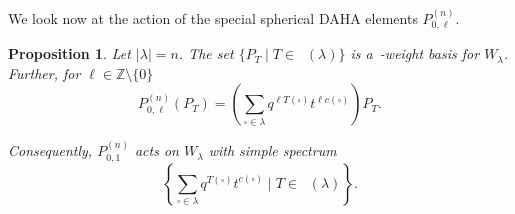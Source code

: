 \documentclass[10pt,a4paper]{amsart}
\numberwithin{equation}{section}
\newtheorem{Proposition}[Theorem]{Proposition}
\theoremstyle{definition}
\DeclareMathOperator{\RSSYT}{\mathrm{RSSYT}_{\geq 0}}
\begin{document}
We look now at the action of the special spherical DAHA elements $P_{0,\ell}^{(n)}$.

\begin{Proposition}\label{finite rank gen macd function properties}
 Let $|\lambda| = n$. The set $\{P_T\mid T \in \RSSYT(\lambda)\}$ is a~-weight basis for $W_{\lambda}$. Further, for $\ell \in \mathbb{Z}\setminus\{0\}$
 \[
 P_{0,\ell}^{(n)}(P_T) = \left( \sum_{\square \in \lambda} q^{\ell T(\square)}t^{\ell c(\square)} \right) P_T.
 \]

 Consequently, $P_{0,1}^{(n)}$ acts on $W_{\lambda}$ with simple spectrum
 \[
 \left\{ \sum_{\square \in \lambda} q^{T(\square)}t^{c(\square)} \mid T \in \RSSYT(\lambda) \right\}.
 \]

\end{Proposition}
\end{document}
